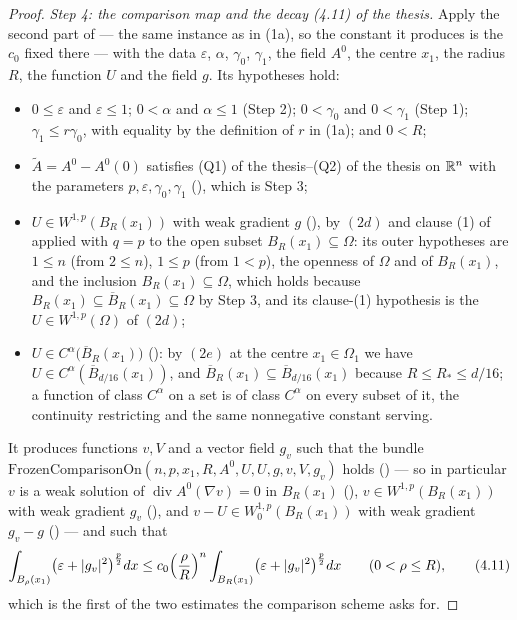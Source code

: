 \begin{proof}
\emph{Step 4: the comparison map and the decay (4.11) of the thesis.}  Apply the
second part of  --- the same instance as in
(1a), so the constant it produces is the $c_0$ fixed there --- with the data
$\varepsilon$, $\alpha$, $\gamma_0$, $\gamma_1$, the field $A^0$, the centre
$x_1$, the radius $R$, the function $U$ and the field $g$.  Its hypotheses
hold:
\begin{itemize}
\item $0\le\varepsilon$ and $\varepsilon\le1$; $0<\alpha$ and $\alpha\le1$
  (Step 2); $0<\gamma_0$ and $0<\gamma_1$ (Step 1); $\gamma_1\le r\gamma_0$,
  with equality by the definition of $r$ in (1a); and $0<R$;
\item $\widetilde A=A^0-A^0(0)$ satisfies (Q1) of the thesis--(Q2) of the thesis on
  $\mathbb{R}^n$ with the parameters $p,\varepsilon,\gamma_0,\gamma_1$
  (), which is Step 3;
\item $U\in W^{1,p}(B_R(x_1))$ with weak gradient $g$ (), by
  $(2d)$ and clause (1) of  applied with $q=p$ to
  the open subset $B_R(x_1)\subseteq\Omega$: its outer hypotheses are $1\le n$
  (from $2\le n$), $1\le p$ (from $1<p$), the openness of $\Omega$ and of
  $B_R(x_1)$, and the inclusion $B_R(x_1)\subseteq\Omega$, which holds because
  $B_R(x_1)\subseteq\overline B_R(x_1)\subseteq\Omega$ by Step 3, and its
  clause-(1) hypothesis is the $U\in W^{1,p}(\Omega)$ of $(2d)$;
\item $U\in C^\alpha\bigl(\overline B_R(x_1)\bigr)$ ():
  by $(2e)$ at the centre $x_1\in\Omega_1$ we have
  $U\in C^\alpha(\overline B_{d/16}(x_1))$, and
  $\overline B_R(x_1)\subseteq\overline B_{d/16}(x_1)$ because
  $R\le R_\ast\le d/16$; a function of class $C^\alpha$ on a set is of class
  $C^\alpha$ on every subset of it, the continuity restricting and the same
  nonnegative constant serving.
\end{itemize}
It produces functions $v,V$ and a vector field $g_v$ such that the bundle
$\mathrm{FrozenComparisonOn}(n,p,x_1,R,A^0,U,U,g,v,V,g_v)$ holds
() --- so in particular $v$ is a weak solution of
$\operatorname{div}A^0(\nabla v)=0$ in $B_R(x_1)$
(), $v\in W^{1,p}(B_R(x_1))$ with weak gradient $g_v$
(), and $v-U\in W^{1,p}_0(B_R(x_1))$ with weak gradient
$g_v-g$ () --- and such that
\[
\int_{B_\rho(x_1)}\bigl(\varepsilon+|g_v|^2\bigr)^{\frac p2}dx
\le c_0\Bigl(\frac\rho R\Bigr)^{n}
\int_{B_R(x_1)}\bigl(\varepsilon+|g_v|^2\bigr)^{\frac p2}dx
\qquad(0<\rho\le R),
\tag{4.11}
\]
which is the first of the two estimates the comparison scheme asks for.


\end{proof}
